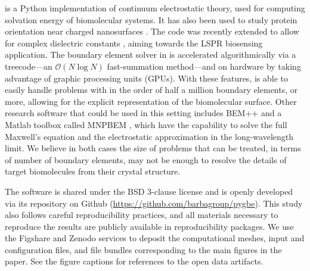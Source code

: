 \pygbe is a Python implementation of continuum electrostatic theory, used
for computing solvation energy of biomolecular systems. 
It has also been used to study protein orientation near charged nanosurfaces \cite{CooperClementiBarba2015}.
The code was recently extended to allow for complex dielectric constants 
\cite{ClementiETal2017}, aiming towards the LSPR biosensing application. 
The boundary element solver in \pygbe
is accelerated algorithmically via a treecode---an $\mathcal{O}(N\log N)$ fast-summation method---and on hardware by taking advantage of graphic processing units (GPUs). 
With these features, \pygbe is able to easily handle problems with in the order of 
half a million boundary elements, or more, 
allowing for the explicit representation of the biomolecular surface.
Other research software that could be used in this setting includes  
BEM++ \cite{SmigajETal2015} and a Matlab toolbox called MNPBEM \cite{HohenesterTrugler2012}, which have the capability to solve the full Maxwell's equation and the electrostatic approximation in the long-wavelength limit.
We believe in both cases the size of problems that can be treated, in terms of number of boundary elements, may not be enough to resolve the details of target biomolecules from their crystal structure. 

The software is shared under the BSD 3-clause license 
and is openly developed via its repository on Github (\url{https://github.com/barbagroup/pygbe}).
This study also follows careful reproducibility practices, and all materials necessary
to reproduce the results are publicly available in reproducibility packages.
We use the Figshare and Zenodo services to deposit the computational meshes,
input and configuration files, and file bundles corresponding to the main figures in the paper.
See the figure captions for references to the open data artifacts.



